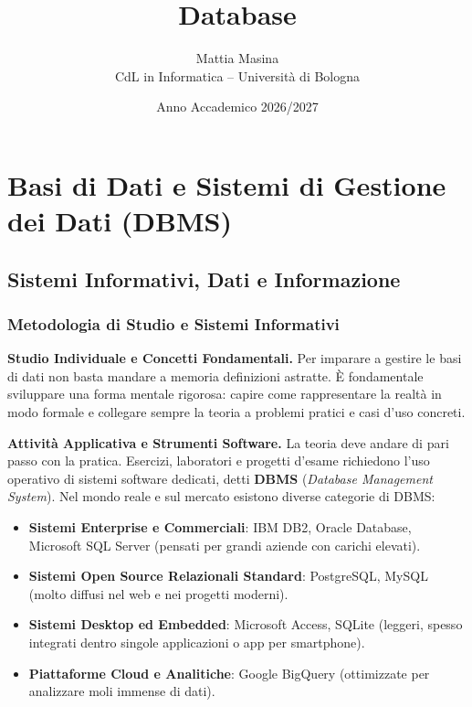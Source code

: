 \documentclass[12pt]{extarticle}
\title{Database}
\author{Mattia Masina\\CdL in Informatica -- Università di Bologna}
\date{Anno Accademico 2026/2027}
\begin{document}
\maketitle
\newpage

\tableofcontents
\newpage

\section{Basi di Dati e Sistemi di Gestione dei Dati (DBMS)}

\subsection{Sistemi Informativi, Dati e Informazione}
\subsubsection{Metodologia di Studio e Sistemi Informativi}
\noindent \textbf{Studio Individuale e Concetti Fondamentali.} Per imparare a gestire le basi di dati non basta mandare a memoria definizioni astratte. È fondamentale sviluppare una forma mentale rigorosa: capire come rappresentare la realtà in modo formale e collegare sempre la teoria a problemi pratici e casi d'uso concreti.

\medskip
\noindent \textbf{Attività Applicativa e Strumenti Software.} La teoria deve andare di pari passo con la pratica. Esercizi, laboratori e progetti d'esame richiedono l'uso operativo di sistemi software dedicati, detti \textbf{DBMS} (\textit{Database Management System}). Nel mondo reale e sul mercato esistono diverse categorie di DBMS:
\begin{itemize}
    \item \textbf{Sistemi Enterprise e Commerciali}: IBM DB2, Oracle Database, Microsoft SQL Server (pensati per grandi aziende con carichi elevati).
    \item \textbf{Sistemi Open Source Relazionali Standard}: PostgreSQL, MySQL (molto diffusi nel web e nei progetti moderni).
    \item \textbf{Sistemi Desktop ed Embedded}: Microsoft Access, SQLite (leggeri, spesso integrati dentro singole applicazioni o app per smartphone).
    \item \textbf{Piattaforme Cloud e Analitiche}: Google BigQuery (ottimizzate per analizzare moli immense di dati).
\end{itemize}
\end{document}
